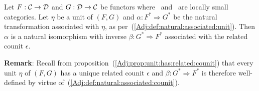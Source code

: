 \begin{prop}\label{Adj:prop:natural:associated:unit:isomorphism}
    Let $F:\mbox{$\cal C$}\to\mbox{$\cal D$}$ and $G:\mbox{$\cal D$}\to\mbox{$\cal C$}$ be functors where \Cat\ and \Dat\ 
    are locally small categories. Let $\eta$ be a unit of $(F,G)$ and 
    $\alpha:F^{*}\Rightarrow G^{*}$ be the natural transformation associated
    with $\eta$, as per~(\ref{Adj:def:natural:associated:unit}). Then $\alpha$ 
    is a natural isomorphism with inverse $\beta:G^{*}\Rightarrow F^{*}$ 
    associated with the related counit $\epsilon$.
\end{prop}
\noindent
{\bf Remark}: Recall from proposition~(\ref{Adj:prop:unit:has:related:counit})
that every unit $\eta$ of $(F,G)$ has a unique related counit $\epsilon$ and
$\beta:G^{*}\Rightarrow F^{*}$ is therefore well-defined by virtue 
of~(\ref{Adj:def:natural:associated:counit}).

